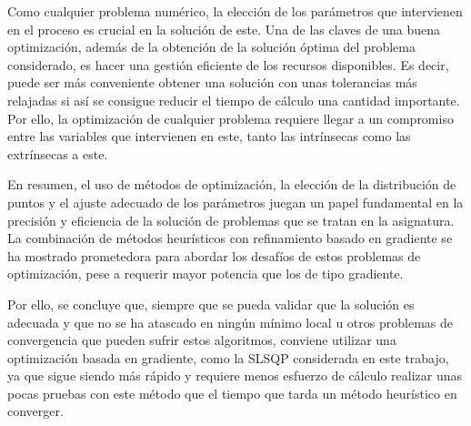 \begin{enumerate}
    Como cualquier problema numérico, la elección de los parámetros que intervienen en el proceso es crucial en la solución de este. Una de las claves de una buena optimización, además de la obtención de la solución óptima del problema considerado, es hacer una gestión eficiente de los recursos disponibles. Es decir, puede ser más conveniente obtener una solución con unas tolerancias más relajadas si así se consigue reducir el tiempo de cálculo una cantidad importante. Por ello, la optimización de cualquier problema requiere llegar a un compromiso entre las variables que intervienen en este, tanto las intrínsecas como las extrínsecas a este. 
\end{enumerate}

En resumen, el uso de métodos de optimización, la elección de la distribución de puntos y el ajuste adecuado de los parámetros juegan un papel fundamental en la precisión y eficiencia de la solución de problemas que se tratan en la asignatura. La combinación de métodos heurísticos con refinamiento basado en gradiente se ha mostrado prometedora para abordar los desafíos de estos problemas de optimización, pese a requerir mayor potencia que los de tipo gradiente. 

Por ello, se concluye que, siempre que se pueda validar que la solución es adecuada y que no se ha atascado en ningún mínimo local u otros problemas de convergencia que pueden sufrir estos algoritmos, conviene utilizar una optimización basada en gradiente, como la SLSQP considerada en este trabajo, ya que sigue siendo más rápido y requiere menos esfuerzo de cálculo realizar unas pocas pruebas con este método que el tiempo que tarda un método heurístico en converger.


\nocite{numpy}